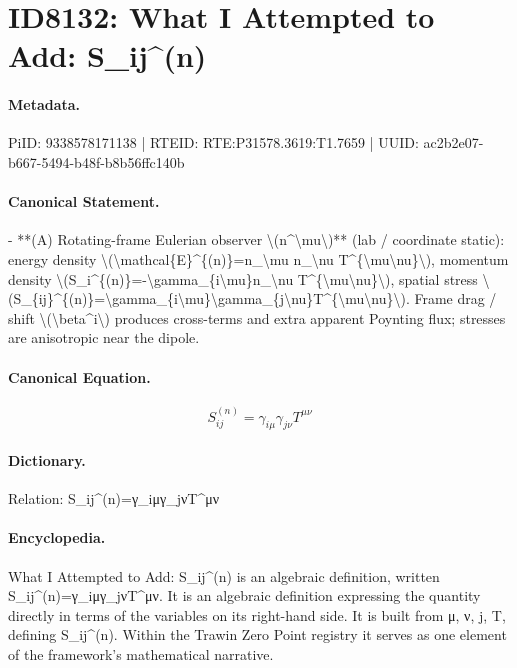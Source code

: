\section*{ID8132: What I Attempted to Add: S\_ij\textasciicircum{}(n)}
\paragraph{Metadata.}
PiID: 9338578171138 | RTEID: RTE:P31578.3619:T1.7659 | UUID: ac2b2e07-b667-5494-b48f-b8b56ffc140b

\paragraph{Canonical Statement.}
- **(A) Rotating-frame Eulerian observer \textbackslash{}(n\textasciicircum{}\textbackslash{}mu\textbackslash{})** (lab / coordinate static): energy density \textbackslash{}(\textbackslash{}mathcal\{E\}\textasciicircum{}\{(n)\}=n\_\textbackslash{}mu n\_\textbackslash{}nu T\textasciicircum{}\{\textbackslash{}mu\textbackslash{}nu\}\textbackslash{}), momentum density \textbackslash{}(S\_i\textasciicircum{}\{(n)\}=-\textbackslash{}gamma\_\{i\textbackslash{}mu\}n\_\textbackslash{}nu T\textasciicircum{}\{\textbackslash{}mu\textbackslash{}nu\}\textbackslash{}), spatial stress \textbackslash{}(S\_\{ij\}\textasciicircum{}\{(n)\}=\textbackslash{}gamma\_\{i\textbackslash{}mu\}\textbackslash{}gamma\_\{j\textbackslash{}nu\}T\textasciicircum{}\{\textbackslash{}mu\textbackslash{}nu\}\textbackslash{}). Frame drag / shift \textbackslash{}(\textbackslash{}beta\textasciicircum{}i\textbackslash{}) produces cross-terms and extra apparent Poynting flux; stresses are anisotropic near the dipole.

\paragraph{Canonical Equation.}
\[
S_{ij}^{(n)}=\gamma_{i\mu}\gamma_{j\nu}T^{\mu\nu}
\]

\paragraph{Dictionary.}
Relation: S\_ij\textasciicircum{}(n)=γ\_iμγ\_jνT\textasciicircum{}μν

\paragraph{Encyclopedia.}
What I Attempted to Add: S\_ij\textasciicircum{}(n) is an algebraic definition, written S\_ij\textasciicircum{}(n)=γ\_iμγ\_jνT\textasciicircum{}μν. It is an algebraic definition expressing the quantity directly in terms of the variables on its right-hand side. It is built from μ, ν, j, T, defining S\_ij\textasciicircum{}(n). Within the Trawin Zero Point registry it serves as one element of the framework's mathematical narrative.
